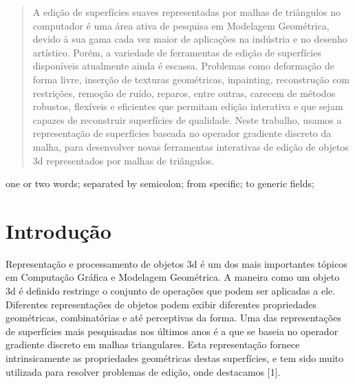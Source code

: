\begin{abstract}
A edição de superfícies suaves representadas por malhas de triângulos no computador é uma área ativa 
de pesquisa em Modelagem Geométrica, devido à sua gama cada vez maior de aplicações na indústria 
e no desenho artístico. Porém, a variedade de ferramentas de edição de superfícies disponíveis atualmente 
ainda é escassa. Problemas como deformação de forma livre, inserção de texturas geométricas, inpainting, 
reconstrução com restrições, remoção de ruído, reparos, entre outras, carecem de métodos robustos, 
flexíveis e eficientes que permitam edição interativa e que sejam capazes de reconstruir superfícies de 
qualidade. 
Neste trabalho, usamos a representação de superfícies baseada no operador gradiente discreto 
da malha, para desenvolver novas ferramentas interativas de edição de objetos 3d representados por malhas 
de triângulos.

%
\end{abstract}

\begin{IEEEkeywords}
one or two words; separated by semicolon; from specific; to generic fields;

\end{IEEEkeywords}


\IEEEpeerreviewmaketitle





\section{Introdução}
%
Representação e processamento de objetos 3d é um dos mais importantes tópicos em Computação 
Gráfica e Modelagem Geométrica. A maneira como um objeto 3d é definido restringe o conjunto de 
operações que podem ser aplicadas a ele. Diferentes representações de objetos podem exibir diferentes 
propriedades geométricas, combinatórias e até perceptivas da forma. 
Uma das representações de superfícies mais pesquisadas nos últimos anos é a que se baseia no 
operador gradiente discreto em malhas triangulares. Esta representação fornece intrinsicamente as 
propriedades geométricas destas superfícies, e tem sido muito utilizada para resolver problemas de 
edição, onde destacamos [1].

